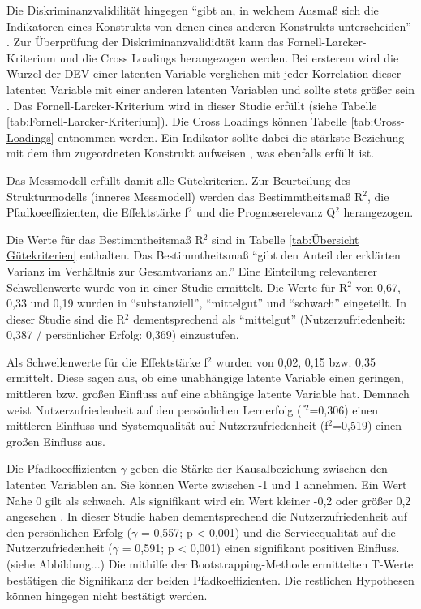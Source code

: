 Die Diskriminanzvalidilität hingegen "`gibt an, in welchem Ausmaß sich die Indikatoren eines Konstrukts von denen eines anderen Konstrukts unterscheiden"' \parencite[S.26]{nitzl2010anwenderorientierte}. Zur Überprüfung der Diskriminanzvalididtät kann das Fornell-Larcker-Kriterium und die Cross Loadings herangezogen werden. 
Bei ersterem wird die Wurzel der DEV einer latenten Variable verglichen mit jeder Korrelation dieser latenten Variable mit einer anderen latenten Variablen und sollte stets größer sein \parencite[vgl.][S.26]{nitzl2010anwenderorientierte}. Das Fornell-Larcker-Kriterium wird in dieser Studie erfüllt (siehe Tabelle \ref{tab:Fornell-Larcker-Kriterium}). Die Cross Loadings können Tabelle \ref{tab:Cross-Loadings} entnommen werden. Ein Indikator sollte dabei die stärkste Beziehung mit dem ihm zugeordneten Konstrukt aufweisen \parencite[vgl.][S.26]{nitzl2010anwenderorientierte}, was ebenfalls erfüllt ist.   \nocite{fornell1981evaluating}

Das Messmodell erfüllt damit alle Gütekriterien. Zur Beurteilung des Strukturmodells (inneres Messmodell) werden das Bestimmtheitsmaß R$^2$, die Pfadkoeeffizienten, die Effektstärke f$^2$ und die Prognoserelevanz Q$^2$ herangezogen.  

Die Werte für das Bestimmtheitsmaß R$^2$ sind in Tabelle \ref{tab:Übersicht Gütekriterien} enthalten. Das Bestimmtheitsmaß "`gibt den Anteil der erklärten Varianz im Verhältnis zur Gesamtvarianz an."' \parencite[S.32]{nitzl2010anwenderorientierte} Eine Einteilung relevanterer Schwellenwerte wurde von \cite[S.323]{chin1998partial} in einer Studie ermittelt. Die Werte für R$^2$ von 0,67, 0,33 und 0,19 wurden in "`substanziell"', "`mittelgut"' und "`schwach"' eingeteilt. In dieser Studie sind die R$^2$ dementsprechend als "`mittelgut"' (Nutzerzufriedenheit: 0,387 / persönlicher Erfolg: 0,369) einzustufen.

Als Schwellenwerte für die Effektstärke f$^2$ wurden von \cite[S.316f.]{chin1998partial} 0,02, 0,15 bzw. 0,35 ermittelt. Diese sagen aus, ob eine unabhängige latente Variable einen geringen, mittleren bzw. großen Einfluss auf eine abhängige latente Variable hat. Demnach weist Nutzerzufriedenheit auf den persönlichen Lernerfolg (f$^2$=0,306) einen mittleren Einfluss und Systemqualität auf Nutzerzufriedenheit (f$^2$=0,519) einen großen Einfluss aus. 

Die Pfadkoeeffizienten $\gamma$ geben die Stärke der Kausalbeziehung zwischen den latenten Variablen an. Sie können Werte zwischen -1 und 1 annehmen. Ein Wert Nahe 0 gilt als schwach. Als signifikant wird ein Wert kleiner -0,2 oder größer 0,2 angesehen \parencite[vgl.][S.11]{chin1998commentary}. In dieser Studie haben dementsprechend die Nutzerzufriedenheit auf den persönlichen Erfolg ($\gamma$ = 0,557; p < 0,001) und die Servicequalität auf die Nutzerzufriedenheit ($\gamma$ = 0,591; p < 0,001) einen signifikant positiven Einfluss. (siehe Abbildung...) Die mithilfe der Bootstrapping-Methode ermittelten T-Werte bestätigen die Signifikanz der beiden Pfadkoeffizienten. Die restlichen Hypothesen können hingegen nicht bestätigt werden. 

